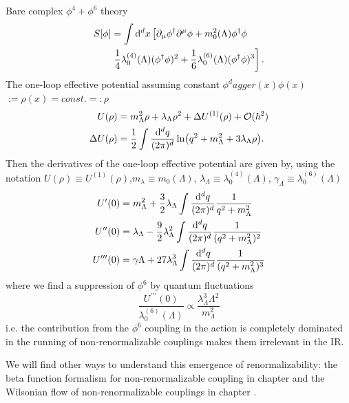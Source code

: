 \begin{mybox}{}
	Bare complex $\phi^4+\phi^6$ theory
	\begin{align}
		S[\phi] &= \int \mathrm{d}^d x \left[\partial_\mu \phi^\dagger \partial^\mu \phi + m^2_0(\Lambda) \phi^\dagger \phi \right.\\
		&\left.\frac{1}{4} \lambda^{(4)}_0(\Lambda) (\phi^\dagger \phi)^2 + \frac{1}{6} \lambda^{(6)}_0(\Lambda)(\phi^\dagger \phi)^3 \right] \nonumber.
	\end{align}
The one-loop effective potential assuming constant $\phi^dagger(x)\phi(x)$$:=\rho(x)=const.=:\rho$
\begin{align}
	U(\rho) &= m^2_\Lambda \rho + \lambda_\Lambda \rho^2 + \Delta U^{(1)}(\rho) + \mathcal{O}(\hbar^2)\\
	\Delta U(\rho) &= \frac{1}{2} \int \frac{\mathrm{d}^d q}{(2\pi)^d} \ln(q^2+m^2_\Lambda+3\lambda_\Lambda \rho).
\end{align}
Then the derivatives of the one-loop effective potential are given by, using the notation $U(\rho)\equiv U^{(1)}(\rho)$,$m_\lambda\equiv m_0(\Lambda)$, $\lambda_\Lambda\equiv \lambda^{(4)}_0(\Lambda)$, $\gamma_\Lambda\equiv \lambda^{(6)}_0(\Lambda)$
\begin{align}
	U^\prime(0) &= m^2_\Lambda + \frac{3}{2} \lambda_\Lambda \int \frac{\mathrm{d}^d q}{(2 \pi)^d} \frac{1}{q^2+m^2_\Lambda}\\
	U^{\prime \prime}(0) &= \lambda_\Lambda - \frac{9}{2} \lambda^2_\Lambda \int \frac{\mathrm{d}^d q}{(2 \pi)^d} \frac{1}{(q^2+m^2_\Lambda)^2}\\
	U^{\prime \prime \prime}(0) &= \gamma\Lambda + 27 \lambda^3_\Lambda \int \frac{\mathrm{d}^d q}{(2 \pi)^d} \frac{1}{(q^2+m^2_\Lambda)^3}
\end{align}
where we find a suppression of $\phi^6$ by quantum fluctuations
\begin{equation}
\frac{U^{\prime \prime \prime}(0)}{\lambda^{(6)}_0(\Lambda)} \propto \frac{\lambda^3_\Lambda \Lambda^2}{m^2_\Lambda}
\end{equation}
i.e. the contribution from the $\phi^6$ coupling in the action is completely dominated in the running of non-renormalizable couplings makes them irrelevant in the IR.
\end{mybox}
We will find other ways to understand this emergence of renormalizability: the beta function formalism for non-renormalizable coupling in chapter  and the Wilsonian flow of non-renormalizable couplings in chapter .

